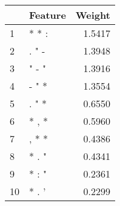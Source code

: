 \begin{tabular}{llr}
\toprule
{} & Feature &  Weight \\
\midrule
1  &   * * : &  1.5417 \\
2  &   . " - &  1.3948 \\
3  &   " - " &  1.3916 \\
4  &   - " * &  1.3554 \\
5  &   . " * &  0.6550 \\
6  &   * , * &  0.5960 \\
7  &   , * * &  0.4386 \\
8  &   * . " &  0.4341 \\
9  &   * : " &  0.2361 \\
10 &   * . ' &  0.2299 \\
\bottomrule
\end{tabular}
